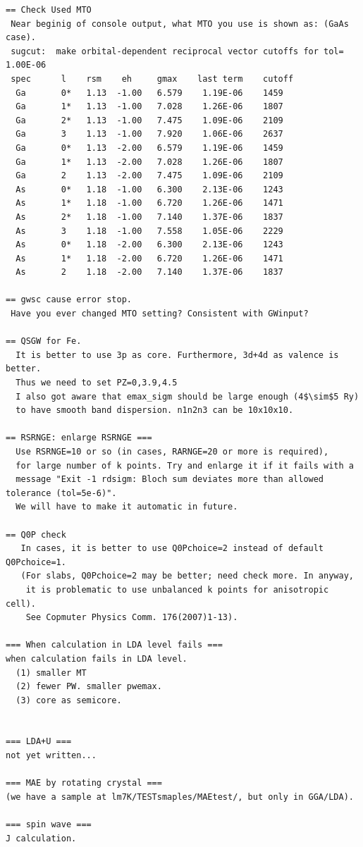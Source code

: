 \documentclass[a4paper,10pt,epsf,fleqn]{article}
\begin{document}
{\begin{verbatim}
== Check Used MTO 
 Near beginig of console output, what MTO you use is shown as: (GaAs case).
 sugcut:  make orbital-dependent reciprocal vector cutoffs for tol= 1.00E-06
 spec      l    rsm    eh     gmax    last term    cutoff
  Ga       0*   1.13  -1.00   6.579    1.19E-06    1459
  Ga       1*   1.13  -1.00   7.028    1.26E-06    1807
  Ga       2*   1.13  -1.00   7.475    1.09E-06    2109
  Ga       3    1.13  -1.00   7.920    1.06E-06    2637
  Ga       0*   1.13  -2.00   6.579    1.19E-06    1459
  Ga       1*   1.13  -2.00   7.028    1.26E-06    1807
  Ga       2    1.13  -2.00   7.475    1.09E-06    2109
  As       0*   1.18  -1.00   6.300    2.13E-06    1243
  As       1*   1.18  -1.00   6.720    1.26E-06    1471
  As       2*   1.18  -1.00   7.140    1.37E-06    1837
  As       3    1.18  -1.00   7.558    1.05E-06    2229
  As       0*   1.18  -2.00   6.300    2.13E-06    1243
  As       1*   1.18  -2.00   6.720    1.26E-06    1471
  As       2    1.18  -2.00   7.140    1.37E-06    1837

== gwsc cause error stop.
 Have you ever changed MTO setting? Consistent with GWinput?

== QSGW for Fe.
  It is better to use 3p as core. Furthermore, 3d+4d as valence is better. 
  Thus we need to set PZ=0,3.9,4.5
  I also got aware that emax_sigm should be large enough (4$\sim$5 Ry) 
  to have smooth band dispersion. n1n2n3 can be 10x10x10.

== RSRNGE: enlarge RSRNGE ===
  Use RSRNGE=10 or so (in cases, RARNGE=20 or more is required), 
  for large number of k points. Try and enlarge it if it fails with a
  message "Exit -1 rdsigm: Bloch sum deviates more than allowed tolerance (tol=5e-6)".
  We will have to make it automatic in future.

== Q0P check
   In cases, it is better to use Q0Pchoice=2 instead of default Q0Pchoice=1.
   (For slabs, Q0Pchoice=2 may be better; need check more. In anyway,
    it is problematic to use unbalanced k points for anisotropic cell).
    See Copmuter Physics Comm. 176(2007)1-13).

=== When calculation in LDA level fails ===
when calculation fails in LDA level.
  (1) smaller MT
  (2) fewer PW. smaller pwemax.
  (3) core as semicore.


=== LDA+U ===
not yet written...

=== MAE by rotating crystal ===
(we have a sample at lm7K/TESTsmaples/MAEtest/, but only in GGA/LDA).

=== spin wave ===
J calculation.



\end{verbatim}}
\end{document}

